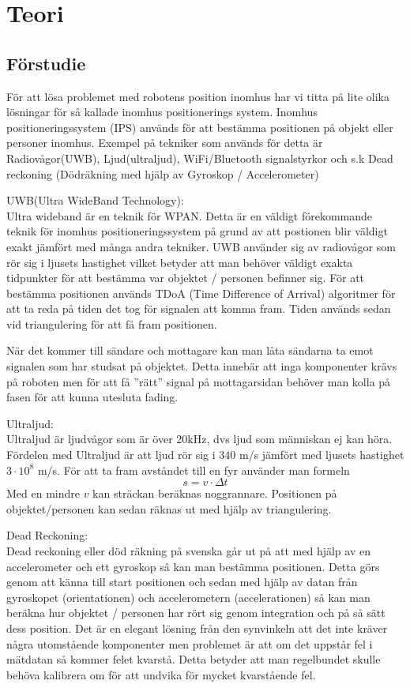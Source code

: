 \documentclass[11pt, a4paper]{report}
\begin{document}
\chapter{Teori}

\section{Förstudie}

För att lösa problemet med robotens position inomhus har vi titta på lite olika lösningar för så kallade inomhus positionerings system. Inomhus positioneringssystem (IPS) används för att bestämma positionen på objekt eller personer inomhus. Exempel på  tekniker som används för detta är Radiovågor(UWB), Ljud(ultraljud), WiFi/Bluetooth signalstyrkor och s.k Dead reckoning (Dödräkning med hjälp av Gyroskop / Accelerometer)


UWB(Ultra WideBand Technology): \\
Ultra wideband är en teknik för WPAN. Detta är en väldigt förekommande teknik för inomhus positioneringssystem på grund av att postionen blir väldigt exakt jämfört med många andra tekniker. UWB använder sig av radiovågor som rör sig i ljusets hastighet vilket betyder att man behöver väldigt exakta tidpunkter för att bestämma var objektet / personen befinner sig. För att bestämma positionen används TDoA (Time Difference of Arrival) algoritmer för att ta reda på tiden det tog för signalen att komma fram. Tiden används sedan vid triangulering för att få fram positionen.

När det kommer till sändare och mottagare kan man låta sändarna ta emot signalen som har studsat på objektet. Detta innebär att inga komponenter krävs på roboten men för att få ''rätt'' signal på mottagarsidan behöver man kolla på fasen för att kunna utesluta fading.

Ultraljud: \\
Ultraljud är ljudvågor som är över 20kHz, dvs ljud som människan ej kan höra. Fördelen med Ultraljud är att ljud rör sig i $340$ m/s jämfört med ljusets hastighet $3 \cdot 10^{8}$ m/s. För att ta fram avståndet till en fyr använder man formeln
\begin{equation}
s = v \cdot \Delta t
\end{equation}
Med en mindre $v$ kan sträckan beräknas noggrannare. Positionen på objektet/personen kan sedan räknas ut med hjälp av triangulering.

Dead Reckoning:\\
Dead reckoning eller död räkning på svenska går ut på att med hjälp av en accelerometer och ett gyroskop så kan man bestämma positionen. Detta görs genom att känna till start positionen och sedan med hjälp av datan från gyroskopet (orientationen) och accelerometern (accelerationen) så kan man beräkna hur objektet / personen har rört sig genom integration och  på så sätt dess position. Det är en elegant lösning från den synvinkeln att det inte kräver några utomstående komponenter men problemet är att om det uppstår fel i mätdatan så kommer felet kvarstå. Detta betyder att man regelbundet skulle behöva kalibrera om för att undvika för mycket kvarstående fel.
\end{document}

